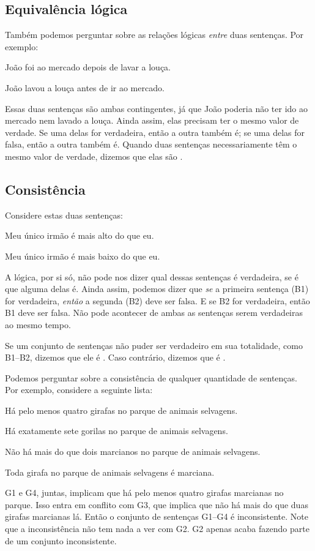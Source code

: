 \subsection{Equivalência lógica}
Também podemos perguntar sobre as relações lógicas \emph{entre} duas sentenças. Por exemplo:
\begin{earg}
\item[] João foi ao mercado depois de lavar a louça.
\item[] João lavou a louça antes de ir ao mercado.
\end{earg}
Essas duas sentenças são ambas contingentes, já que João poderia não ter ido ao mercado nem lavado a louça. Ainda assim, elas precisam ter o mesmo valor de verdade. Se uma delas for verdadeira, então a outra também é; se uma delas for falsa, então a outra também é. Quando duas sentenças necessariamente têm o mesmo valor de verdade, dizemos que elas são .

\subsection{Consistência}
Considere estas duas sentenças:
\begin{ekey}
\item[B1] Meu único irmão é mais alto do que eu.
\item[B2] Meu único irmão é mais baixo do que eu.
\end{ekey}
A lógica, por si só, não pode nos dizer qual dessas sentenças é verdadeira, se é que alguma delas é. Ainda assim, podemos dizer que \emph{se} a primeira sentença (B1) for verdadeira, \emph{então} a segunda (B2) deve ser falsa. E se B2 for verdadeira, então B1 deve ser falsa. Não pode acontecer de ambas as sentenças serem verdadeiras ao mesmo tempo.

Se um conjunto de sentenças não puder ser verdadeiro em sua totalidade, como B1--B2, dizemos que ele é . Caso contrário, dizemos que é .

Podemos perguntar sobre a consistência de qualquer quantidade de sentenças. Por exemplo, considere a seguinte lista:
\label{MartianGiraffes}
\begin{ekey}
\item[G1] Há pelo menos quatro girafas no parque de animais selvagens.
\item[G2] Há exatamente sete gorilas no parque de animais selvagens.
\item[G3] Não há mais do que dois marcianos no parque de animais selvagens.
\item[G4] Toda girafa no parque de animais selvagens é marciana.
\end{ekey}
G1 e G4, juntas, implicam que há pelo menos quatro girafas marcianas no parque. Isso entra em conflito com G3, que implica que não há mais do que duas girafas marcianas lá. Então o conjunto de sentenças G1--G4 é inconsistente. Note que a inconsistência não tem nada a ver com G2. G2 apenas acaba fazendo parte de um conjunto inconsistente.

